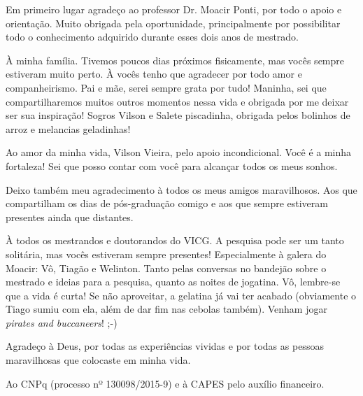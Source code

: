 
Em primeiro lugar agradeço ao professor Dr. Moacir Ponti, por todo o apoio e orientação. Muito obrigada pela oportunidade, principalmente por possibilitar todo o conhecimento adquirido durante esses dois anos de mestrado.

À minha família. Tivemos poucos dias próximos fisicamente, mas vocês sempre estiveram muito perto. À vocês tenho que agradecer por todo amor e companheirismo. Pai e mãe, serei sempre grata por tudo! Maninha, sei que compartilharemos muitos outros momentos nessa vida e obrigada por me deixar ser sua inspiração! Sogros Vilson e Salete piscadinha, obrigada pelos bolinhos de arroz e melancias geladinhas!

Ao amor da minha vida, Vilson Vieira, pelo apoio incondicional. Você é a minha fortaleza! Sei que posso contar com você para alcançar todos os meus sonhos.

Deixo também meu agradecimento à todos os meus amigos maravilhosos. Aos que compartilham os dias de pós-graduação comigo e aos que sempre estiveram presentes ainda que distantes.

À todos os mestrandos e doutorandos do VICG. A pesquisa pode ser um tanto solitária, mas vocês estiveram sempre presentes! Especialmente à galera do Moacir: Vô, Tiagão e Welinton. Tanto pelas conversas no bandejão sobre o mestrado e ideias para a pesquisa, quanto as noites de jogatina. Vô, lembre-se que a vida é curta! Se não aproveitar, a gelatina já vai ter acabado (obviamente o Tiago sumiu com ela, além de dar fim nas cebolas também). Venham jogar \textit{pirates and buccaneers}! ;-)

Agradeço à Deus, por todas as experiências vividas e por todas as pessoas maravilhosas que colocaste em minha vida.

Ao CNPq (processo nº 130098/2015-9) e à CAPES pelo auxílio financeiro.
